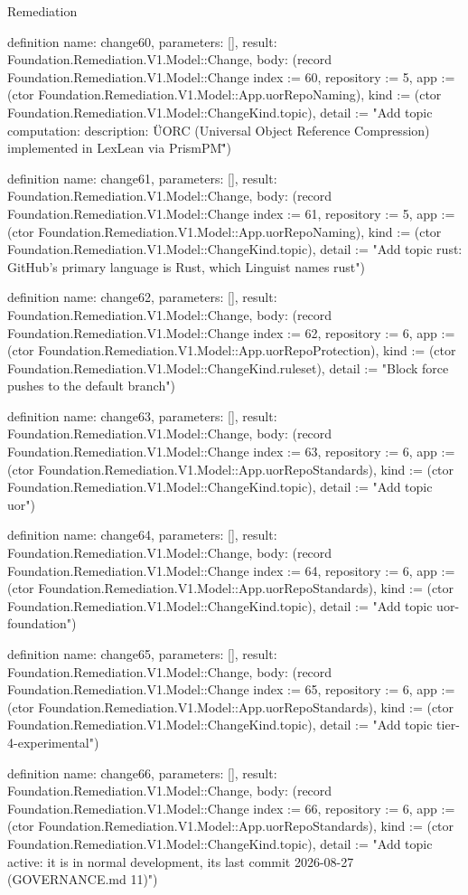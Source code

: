 \begin{lexlean}{Remediation}
\begin{semanticmodule}
definition{
  name: change60,
  parameters: [],
  result: Foundation.Remediation.V1.Model::Change,
  body: (record Foundation.Remediation.V1.Model::Change {index := 60, repository := 5, app := (ctor Foundation.Remediation.V1.Model::App.uorRepoNaming), kind := (ctor Foundation.Remediation.V1.Model::ChangeKind.topic), detail := "Add topic computation: description: \"UORC (Universal Object Reference Compression) implemented in LexLean via PrismPM\""})
}

definition{
  name: change61,
  parameters: [],
  result: Foundation.Remediation.V1.Model::Change,
  body: (record Foundation.Remediation.V1.Model::Change {index := 61, repository := 5, app := (ctor Foundation.Remediation.V1.Model::App.uorRepoNaming), kind := (ctor Foundation.Remediation.V1.Model::ChangeKind.topic), detail := "Add topic rust: GitHub's primary language is Rust, which Linguist names rust"})
}

definition{
  name: change62,
  parameters: [],
  result: Foundation.Remediation.V1.Model::Change,
  body: (record Foundation.Remediation.V1.Model::Change {index := 62, repository := 6, app := (ctor Foundation.Remediation.V1.Model::App.uorRepoProtection), kind := (ctor Foundation.Remediation.V1.Model::ChangeKind.ruleset), detail := "Block force pushes to the default branch"})
}

definition{
  name: change63,
  parameters: [],
  result: Foundation.Remediation.V1.Model::Change,
  body: (record Foundation.Remediation.V1.Model::Change {index := 63, repository := 6, app := (ctor Foundation.Remediation.V1.Model::App.uorRepoStandards), kind := (ctor Foundation.Remediation.V1.Model::ChangeKind.topic), detail := "Add topic uor"})
}

definition{
  name: change64,
  parameters: [],
  result: Foundation.Remediation.V1.Model::Change,
  body: (record Foundation.Remediation.V1.Model::Change {index := 64, repository := 6, app := (ctor Foundation.Remediation.V1.Model::App.uorRepoStandards), kind := (ctor Foundation.Remediation.V1.Model::ChangeKind.topic), detail := "Add topic uor-foundation"})
}

definition{
  name: change65,
  parameters: [],
  result: Foundation.Remediation.V1.Model::Change,
  body: (record Foundation.Remediation.V1.Model::Change {index := 65, repository := 6, app := (ctor Foundation.Remediation.V1.Model::App.uorRepoStandards), kind := (ctor Foundation.Remediation.V1.Model::ChangeKind.topic), detail := "Add topic tier-4-experimental"})
}

definition{
  name: change66,
  parameters: [],
  result: Foundation.Remediation.V1.Model::Change,
  body: (record Foundation.Remediation.V1.Model::Change {index := 66, repository := 6, app := (ctor Foundation.Remediation.V1.Model::App.uorRepoStandards), kind := (ctor Foundation.Remediation.V1.Model::ChangeKind.topic), detail := "Add topic active: it is in normal development, its last commit 2026-08-27 (GOVERNANCE.md 11)"})
}


\end{semanticmodule}
\end{lexlean}
